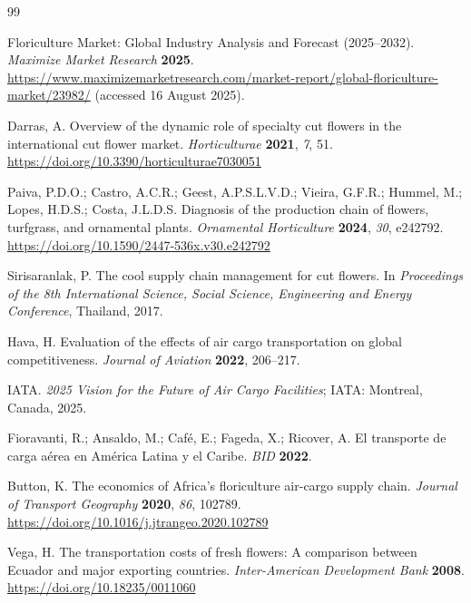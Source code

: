 \documentclass[12pt,a4paper]{article}
\begin{document}

\begin{thebibliography}{99}

Floriculture Market: Global Industry Analysis and Forecast (2025--2032).
\textit{Maximize Market Research} \textbf{2025}.
\url{https://www.maximizemarketresearch.com/market-report/global-floriculture-market/23982/}
(accessed 16 August 2025).

Darras, A. Overview of the dynamic role of specialty cut flowers in
the international cut flower market.
\textit{Horticulturae} \textbf{2021}, \textit{7}, 51.
\url{https://doi.org/10.3390/horticulturae7030051}

Paiva, P.D.O.; Castro, A.C.R.; Geest, A.P.S.L.V.D.; Vieira, G.F.R.;
Hummel, M.; Lopes, H.D.S.; Costa, J.L.D.S.
Diagnosis of the production chain of flowers, turfgrass, and
ornamental plants.
\textit{Ornamental Horticulture} \textbf{2024}, \textit{30}, e242792.
\url{https://doi.org/10.1590/2447-536x.v30.e242792}

Sirisaranlak, P. The cool supply chain management for cut flowers.
In \textit{Proceedings of the 8th International Science, Social
Science, Engineering and Energy Conference}, Thailand, 2017.

Hava, H. Evaluation of the effects of air cargo transportation on
global competitiveness.
\textit{Journal of Aviation} \textbf{2022}, 206--217.

IATA. \textit{2025 Vision for the Future of Air Cargo Facilities};
IATA: Montreal, Canada, 2025.

Fioravanti, R.; Ansaldo, M.; Caf\'{e}, E.; Fageda, X.; Ricover, A.
El transporte de carga a\'{e}rea en Am\'{e}rica Latina y el Caribe.
\textit{BID} \textbf{2022}.

Button, K. The economics of Africa's floriculture air-cargo supply
chain.
\textit{Journal of Transport Geography} \textbf{2020}, \textit{86},
102789.
\url{https://doi.org/10.1016/j.jtrangeo.2020.102789}

Vega, H. The transportation costs of fresh flowers: A comparison
between Ecuador and major exporting countries.
\textit{Inter-American Development Bank} \textbf{2008}.
\url{https://doi.org/10.18235/0011060}


\end{thebibliography}
\end{document}
